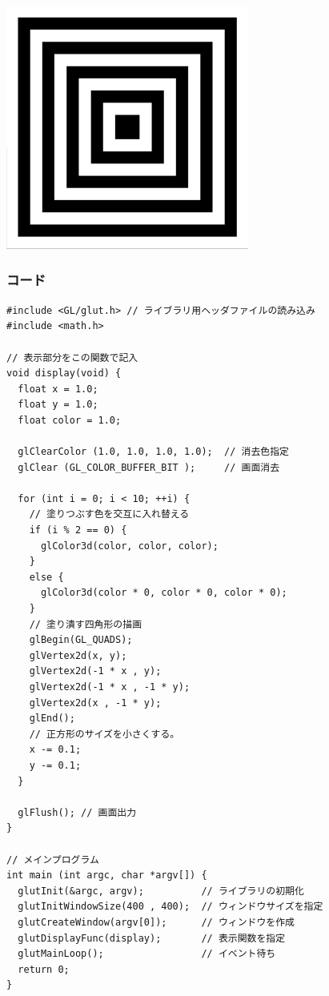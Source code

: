 \documentclass{scrartcl}
\begin{document}
\begin{center}
\includegraphics[width=8cm]{./2017-10-04-01.png}
\end{center}
\subsubsection{コード}
\label{sec:org2169f02}

\begin{verbatim}
#include <GL/glut.h> // ライブラリ用ヘッダファイルの読み込み
#include <math.h>

// 表示部分をこの関数で記入
void display(void) {
  float x = 1.0;
  float y = 1.0;
  float color = 1.0;

  glClearColor (1.0, 1.0, 1.0, 1.0);  // 消去色指定
  glClear (GL_COLOR_BUFFER_BIT );     // 画面消去

  for (int i = 0; i < 10; ++i) {
    // 塗りつぶす色を交互に入れ替える
    if (i % 2 == 0) {
      glColor3d(color, color, color);
    }
    else {
      glColor3d(color * 0, color * 0, color * 0);
    }
    // 塗り潰す四角形の描画
    glBegin(GL_QUADS);
    glVertex2d(x, y);
    glVertex2d(-1 * x , y);
    glVertex2d(-1 * x , -1 * y);
    glVertex2d(x , -1 * y);
    glEnd();
    // 正方形のサイズを小さくする。
    x -= 0.1;
    y -= 0.1;
  }

  glFlush(); // 画面出力
}

// メインプログラム
int main (int argc, char *argv[]) { 
  glutInit(&argc, argv);          // ライブラリの初期化
  glutInitWindowSize(400 , 400);  // ウィンドウサイズを指定
  glutCreateWindow(argv[0]);      // ウィンドウを作成
  glutDisplayFunc(display);       // 表示関数を指定
  glutMainLoop();                 // イベント待ち
  return 0;
}
\end{verbatim}
\end{document}
